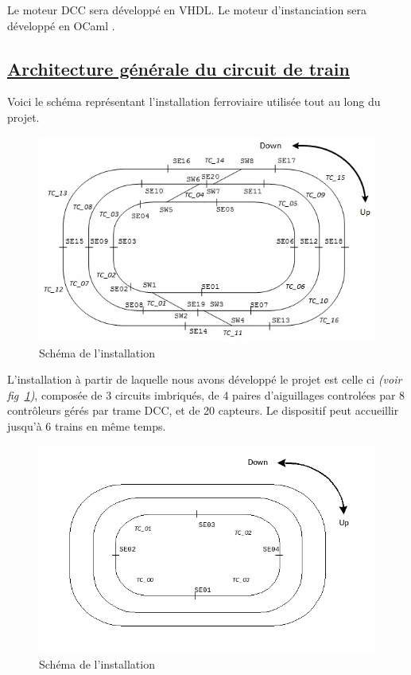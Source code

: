 Le moteur DCC sera développé en VHDL. Le moteur d'instanciation sera
développé en OCaml \cite{OCAML}.


\newpage
\subsection{\underline{Architecture g\'en\'erale du circuit de train}}
\label{sec:archi}

Voici le sch\'ema repr\'esentant l'installation ferroviaire utilis\'ee
tout au long du projet. 

\begin{figure}[h]
\centering
\includegraphics[scale=0.55]{circuit_complet.jpg}
\caption{Sch\'ema de l'installation}
\label{fig4}
\end{figure}

L'installation à partir de laquelle nous avons développé le projet est
celle ci \emph{(voir fig~\ref{fig4})}, compos\'ee de 3
circuits imbriqués, de 4 paires d'aiguillages control\'ees par 8
contr\^oleurs gérés par trame DCC, et de 20 capteurs.
Le dispositif peut accueillir jusqu'\`a 6 trains en m\^eme temps.

\begin{figure}[h]
\centering
\includegraphics[scale=0.55]{circuit_vrai.png}
\caption{Sch\'ema de l'installation}
\label{schéma réél}
\end{figure}

